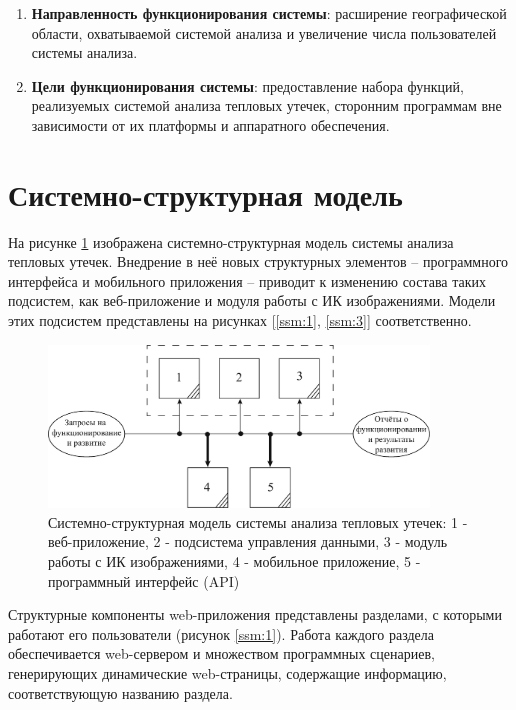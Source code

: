 \begin{enumerate}
	\item \textbf{Направленность функционирования системы}: расширение географической области, охватываемой системой анализа и увеличение числа пользователей системы анализа.

	\item \textbf{Цели функционирования системы}: предоставление набора функций, реализуемых системой анализа тепловых утечек, сторонним программам вне зависимости от их платформы и аппаратного обеспечения.

\end{enumerate}

\section{Системно-структурная модель}

\par 
	На рисунке \ref{ssm:0} изображена системно-структурная модель системы анализа тепловых утечек. Внедрение в неё новых структурных элементов -- программного интерфейса и мобильного приложения -- приводит к изменению состава таких подсистем, как веб-приложение и модуля работы с ИК изображениями. Модели этих подсистем представлены на рисунках [\ref{ssm:1}, \ref{ssm:3}] соответственно.

	 \begin{figure}[h!]
      \centering
      \includegraphics[width=0.9\textwidth]{images/ssm/0}
      \caption{Системно-структурная модель системы анализа тепловых утечек: 1 - веб-приложение, 2 - подсистема управления данными, 3 - модуль работы с ИК изображениями, 4 - мобильное приложение, 5 - программный интерфейс (API)}
      \label{ssm:0}
    \end{figure}

\par 
	Структурные компоненты web-приложения представлены разделами, с которыми работают его пользователи (рисунок \ref{ssm:1}). Работа каждого раздела обеспечивается web-сервером и множеством программных сценариев, генерирующих динамические web-страницы, содержащие информацию, соответствующую названию раздела.

